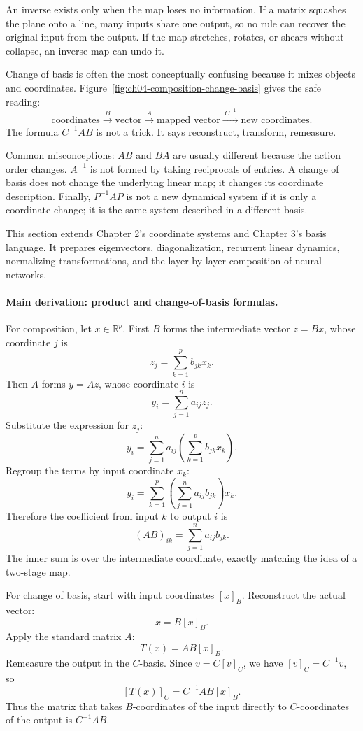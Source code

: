 An inverse exists only when the map loses no information. If a matrix squashes the plane onto a line, many inputs share one output, so no rule can recover the original input from the output. If the map stretches, rotates, or shears without collapse, an inverse map can undo it.

Change of basis is often the most conceptually confusing because it mixes objects and coordinates. Figure~\ref{fig:ch04-composition-change-basis} gives the safe reading:
\[
\text{coordinates} \xrightarrow{\;B\;} \text{vector}
\xrightarrow{\;A\;} \text{mapped vector}
\xrightarrow{\;C^{-1}\;} \text{new coordinates}.
\]
The formula \(C^{-1}AB\) is not a trick. It says reconstruct, transform, remeasure.

Common misconceptions: \(AB\) and \(BA\) are usually different because the action order changes. \(A^{-1}\) is not formed by taking reciprocals of entries. A change of basis does not change the underlying linear map; it changes its coordinate description. Finally, \(P^{-1}AP\) is not a new dynamical system if it is only a coordinate change; it is the same system described in a different basis.

This section extends Chapter 2's coordinate systems and Chapter 3's basis language. It prepares eigenvectors, diagonalization, recurrent linear dynamics, normalizing transformations, and the layer-by-layer composition of neural networks.

\paragraph{Main derivation: product and change-of-basis formulas.}
For composition, let \(x\in\mathbb{R}^p\). First \(B\) forms the intermediate vector \(z=Bx\), whose coordinate \(j\) is
\[
z_j=\sum_{k=1}^p b_{jk}x_k.
\]
Then \(A\) forms \(y=Az\), whose coordinate \(i\) is
\[
y_i=\sum_{j=1}^n a_{ij}z_j.
\]
Substitute the expression for \(z_j\):
\[
y_i=\sum_{j=1}^n a_{ij}\left(\sum_{k=1}^p b_{jk}x_k\right).
\]
Regroup the terms by input coordinate \(x_k\):
\[
y_i=\sum_{k=1}^p\left(\sum_{j=1}^n a_{ij}b_{jk}\right)x_k.
\]
Therefore the coefficient from input \(k\) to output \(i\) is
\[
(AB)_{ik}=\sum_{j=1}^n a_{ij}b_{jk}.
\]
The inner sum is over the intermediate coordinate, exactly matching the idea of a two-stage map.

For change of basis, start with input coordinates \([x]_B\). Reconstruct the actual vector:
\[
x=B[x]_B.
\]
Apply the standard matrix \(A\):
\[
T(x)=A B[x]_B.
\]
Remeasure the output in the \(C\)-basis. Since \(v=C[v]_C\), we have \([v]_C=C^{-1}v\), so
\[
[T(x)]_C=C^{-1}AB[x]_B.
\]
Thus the matrix that takes \(B\)-coordinates of the input directly to \(C\)-coordinates of the output is \(C^{-1}AB\).

